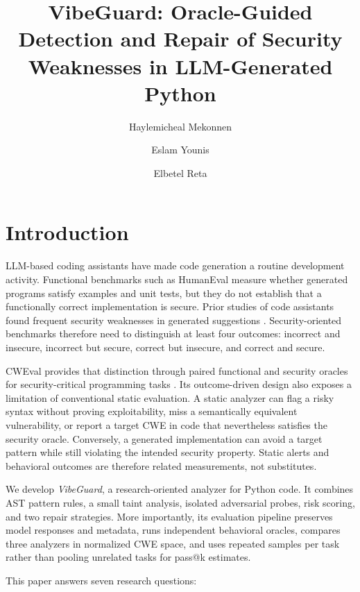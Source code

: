 \documentclass[sigconf,nonacm]{acmart}
\title{VibeGuard: Oracle-Guided Detection and Repair of Security Weaknesses in LLM-Generated Python}
\author{Haylemicheal Mekonnen}
\affiliation{%
  \institution{Paris Lodron University of Salzburg}
  \city{Salzburg}
  \country{Austria}}
\author{Eslam Younis}
\affiliation{%
  \institution{Paris Lodron University of Salzburg}
  \city{Salzburg}
  \country{Austria}}
\author{Elbetel Reta}
\affiliation{%
  \institution{Paris Lodron University of Salzburg}
  \city{Salzburg}
  \country{Austria}}
\begin{document}
\maketitle

\section{Introduction}

LLM-based coding assistants have made code generation a routine development
activity. Functional benchmarks such as HumanEval measure whether generated
programs satisfy examples and unit tests, but they do not establish that a
functionally correct implementation is secure. Prior studies of code
assistants found frequent security weaknesses in generated suggestions
\cite{pearce2022asleep,perry2022users}. Security-oriented benchmarks therefore
need to distinguish at least four outcomes: incorrect and insecure, incorrect
but secure, correct but insecure, and correct and secure.

CWEval provides that distinction through paired functional and security
oracles for security-critical programming tasks \cite{peng2025cweval}. Its
outcome-driven design also exposes a limitation of conventional static
evaluation. A static analyzer can flag a risky syntax without proving
exploitability, miss a semantically equivalent vulnerability, or report a
target CWE in code that nevertheless satisfies the security oracle. Conversely,
a generated implementation can avoid a target pattern while still violating
the intended security property. Static alerts and behavioral outcomes are
therefore related measurements, not substitutes.

We develop \emph{VibeGuard}, a research-oriented analyzer for Python code. It
combines AST pattern rules, a small taint analysis, isolated adversarial probes,
risk scoring, and two repair strategies. More importantly, its evaluation
pipeline preserves model responses and metadata, runs independent behavioral
oracles, compares three analyzers in normalized CWE space, and uses repeated
samples per task rather than pooling unrelated tasks for pass@k estimates.

This paper answers seven research questions:
\end{document}
